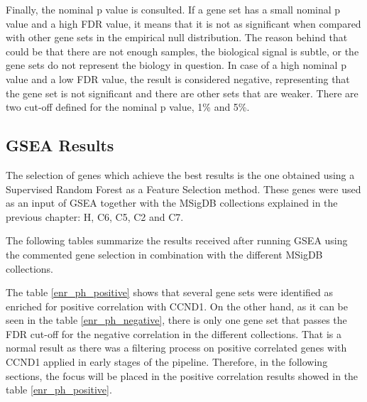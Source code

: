 Finally, the nominal p value is consulted. If a gene set has a small nominal p value and a high FDR value, it means that it is not as significant when compared with other gene sets in the empirical null distribution. The reason behind that could be that there are not enough samples, the biological signal is subtle, or the gene sets do not represent the biology in question.
In case of a high nominal p value and a low FDR value, the result is considered negative, representing that the gene set is not significant and there are other sets that are weaker.
There are two cut-off defined for the nominal p value, 1\% and 5\%.







\subsection{GSEA Results}

The selection of genes which achieve the best results is the one obtained using a Supervised Random Forest as a Feature Selection method. These genes were used as an input of GSEA together with the MSigDB collections explained in the previous chapter: H, C6, C5, C2 and C7.

The following tables summarize the results received after running GSEA using the commented gene selection in combination with the different MSigDB collections.

The table \ref{enr_ph_positive} shows that several gene sets were identified as enriched for positive correlation with CCND1. On the other hand, as it can be seen in the table \ref{enr_ph_negative}, there is only one gene set that passes the FDR cut-off for the negative correlation in the different collections. That is a normal result as there was a filtering process on positive correlated genes with CCND1 applied in early stages of the pipeline. Therefore, in the following sections, the focus will be placed in the positive correlation results showed in the table \ref{enr_ph_positive}.

